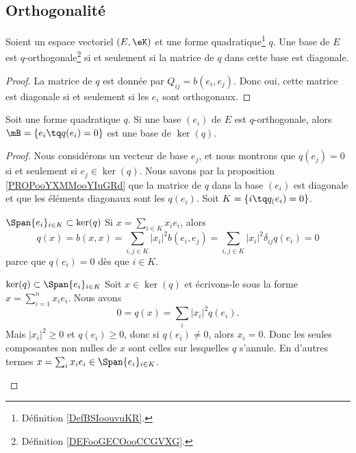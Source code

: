 \subsection{Orthogonalité}

\begin{proposition}       \label{PROPooYXMMooYIuGRd}
    Soient un espace vectoriel \( (E,\eK)\) et une forme quadratique\footnote{Définition \ref{DefBSIoouvuKR}.} \( q\). Une base de \( E\) est \( q\)-orthogonale\footnote{Définition \ref{DEFooGECOooCCGVXG}.} si et seulement si la matrice de \( q\) dans cette base est diagonale.
\end{proposition}

\begin{proof}
    La matrice de \( q\) est donnée par \( Q_{ij}=b(e_i,e_j)\). Donc oui, cette matrice est diagonale si et seulement si les \( e_i\) sont orthogonaux.
\end{proof}

\begin{proposition}
    Soit une forme quadratique \( q\). Si une base \( (e_i )\) de \( E\) est \( q\)-orthogonale, alors \( \mB=\{ e_i\tq q(e_i)=0 \}\) est une base de \( \ker(q)\).
\end{proposition}

\begin{proof}
    Nous considérons un vecteur de base \( e_j\), et nous montrons que \( q(e_j)=0\) si et seulement si \( e_j\in\ker(q)\). Nous savons par la proposition \ref{PROPooYXMMooYIuGRd} que la matrice de \( q\) dans la base \( (e_i)\) est diagonale et que les éléments diagonaux sont les \( q(e_i)\). Soit \( K=\{ i\tq q_(e_i)=0 \}\).
    \begin{subproof}
    \item[\( \Span\{ e_i \}_{i\in K}\subset\ker(q)\)]
        Si \( x=\sum_{i\in K}x_ie_i\), alors 
        \begin{equation}
            q(x)=b(x,x)=\sum_{i,j\in K}| x_i |^2b(e_i,e_j)=\sum_{i,j\in K}| x_i |^2\delta_{ij}q(e_i)=0
        \end{equation}
        parce que \( q(e_i)=0\) dès que \( i\in K\).
        \item{\( \ker(q)\subset\Span\{ e_i \}_{i\in K}\)}
            Soit \( x\in \ker(q)\) et écrivons-le sous la forme \( x=\sum_{i=1}^nx_ie_i\). Nous avons
            \begin{equation}
                0=q(x)=\sum_i| x_i |^2q(e_i).
            \end{equation}
            Mais \(    | x_i |^2\geq 0 \) et \( q(e_i)\geq 0\), donc si \( q(e_i)\neq 0\), alors \( x_i=0\). Donc les seules composantes non nulles de \( x\) sont celles sur lesquelles \( q\) s'annule. En d'autres termes \( x=\sum_ix_ie_i\in \Span\{ e_i \}_{i\in K}\).
    \end{subproof}
\end{proof}

